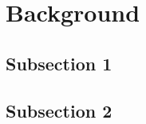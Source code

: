 \section{Background} \label{sec:background}
%
\subsection{Subsection 1}
%
\subsection{Subsection 2}
%
